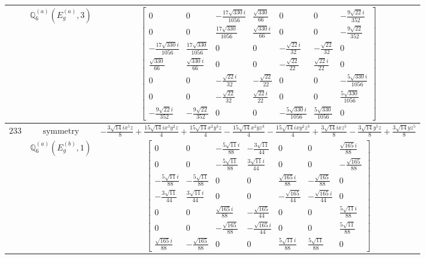 \documentclass[fleqn,8pt,landscape]{jsarticle}
\begin{document}
\begin{longtable}{ccc}
$  $ & $ \mathbb{Q}_{6}^{(a)}(E_{g}^{(a)},3) $ & $ \begin{bmatrix} 0 & 0 & - \frac{17 \sqrt{330} i}{1056} & \frac{\sqrt{330}}{66} & 0 & 0 & - \frac{9 \sqrt{22} i}{352} \\ 0 & 0 & \frac{17 \sqrt{330}}{1056} & \frac{\sqrt{330} i}{66} & 0 & 0 & - \frac{9 \sqrt{22}}{352} \\ - \frac{17 \sqrt{330} i}{1056} & \frac{17 \sqrt{330}}{1056} & 0 & 0 & - \frac{\sqrt{22} i}{32} & - \frac{\sqrt{22}}{32} & 0 \\ \frac{\sqrt{330}}{66} & \frac{\sqrt{330} i}{66} & 0 & 0 & - \frac{\sqrt{22}}{22} & \frac{\sqrt{22} i}{22} & 0 \\ 0 & 0 & - \frac{\sqrt{22} i}{32} & - \frac{\sqrt{22}}{22} & 0 & 0 & - \frac{5 \sqrt{330} i}{1056} \\ 0 & 0 & - \frac{\sqrt{22}}{32} & \frac{\sqrt{22} i}{22} & 0 & 0 & \frac{5 \sqrt{330}}{1056} \\ - \frac{9 \sqrt{22} i}{352} & - \frac{9 \sqrt{22}}{352} & 0 & 0 & - \frac{5 \sqrt{330} i}{1056} & \frac{5 \sqrt{330}}{1056} & 0 \end{bmatrix} $ \\ \hline
$ 233 $ & $ \text{symmetry} $ & $ - \frac{3 \sqrt{14} i x^{5} z}{8} + \frac{15 \sqrt{14} i x^{3} y^{2} z}{4} + \frac{15 \sqrt{14} x^{2} y^{3} z}{4} - \frac{15 \sqrt{14} x^{2} y z^{3}}{4} - \frac{15 \sqrt{14} i x y^{2} z^{3}}{4} + \frac{3 \sqrt{14} i x z^{5}}{8} - \frac{3 \sqrt{14} y^{5} z}{8} + \frac{3 \sqrt{14} y z^{5}}{8} $ \\
$  $ & $ \mathbb{Q}_{6}^{(a)}(E_{g}^{(b)},1) $ & $ \begin{bmatrix} 0 & 0 & - \frac{5 \sqrt{11} i}{88} & - \frac{3 \sqrt{11}}{44} & 0 & 0 & \frac{\sqrt{165} i}{88} \\ 0 & 0 & - \frac{5 \sqrt{11}}{88} & \frac{3 \sqrt{11} i}{44} & 0 & 0 & - \frac{\sqrt{165}}{88} \\ - \frac{5 \sqrt{11} i}{88} & - \frac{5 \sqrt{11}}{88} & 0 & 0 & \frac{\sqrt{165} i}{88} & - \frac{\sqrt{165}}{88} & 0 \\ - \frac{3 \sqrt{11}}{44} & \frac{3 \sqrt{11} i}{44} & 0 & 0 & - \frac{\sqrt{165}}{44} & - \frac{\sqrt{165} i}{44} & 0 \\ 0 & 0 & \frac{\sqrt{165} i}{88} & - \frac{\sqrt{165}}{44} & 0 & 0 & \frac{5 \sqrt{11} i}{88} \\ 0 & 0 & - \frac{\sqrt{165}}{88} & - \frac{\sqrt{165} i}{44} & 0 & 0 & \frac{5 \sqrt{11}}{88} \\ \frac{\sqrt{165} i}{88} & - \frac{\sqrt{165}}{88} & 0 & 0 & \frac{5 \sqrt{11} i}{88} & \frac{5 \sqrt{11}}{88} & 0 \end{bmatrix} $ \\ \hline

\end{longtable}
\end{document}
